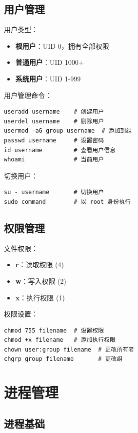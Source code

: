 \documentclass[12pt,UTF8]{ctexbook}
\begin{document}
\section{用户管理}
\label{sec:user_management}

用户类型：
\begin{itemize}
    \item \textbf{根用户}：UID 0，拥有全部权限
    \item \textbf{普通用户}：UID 1000+
    \item \textbf{系统用户}：UID 1-999
\end{itemize}

用户管理命令：
\begin{verbatim}
useradd username    # 创建用户
userdel username    # 删除用户
usermod -aG group username  # 添加到组
passwd username     # 设置密码
id username         # 查看用户信息
whoami              # 当前用户
\end{verbatim}

切换用户：
\begin{verbatim}
su - username       # 切换用户
sudo command        # 以 root 身份执行
\end{verbatim}

\section{权限管理}
\label{sec:permission_management}

文件权限：
\begin{itemize}
    \item \textbf{r}：读取权限 (4)
    \item \textbf{w}：写入权限 (2)
    \item \textbf{x}：执行权限 (1)
\end{itemize}

权限设置：
\begin{verbatim}
chmod 755 filename  # 设置权限
chmod +x filename   # 添加执行权限
chown user:group filename  # 更改所有者
chgrp group filename       # 更改组
\end{verbatim}

\chapter{进程管理}
\label{chap:process_management}

\section{进程基础}
\label{sec:process_basics}
\end{document}
